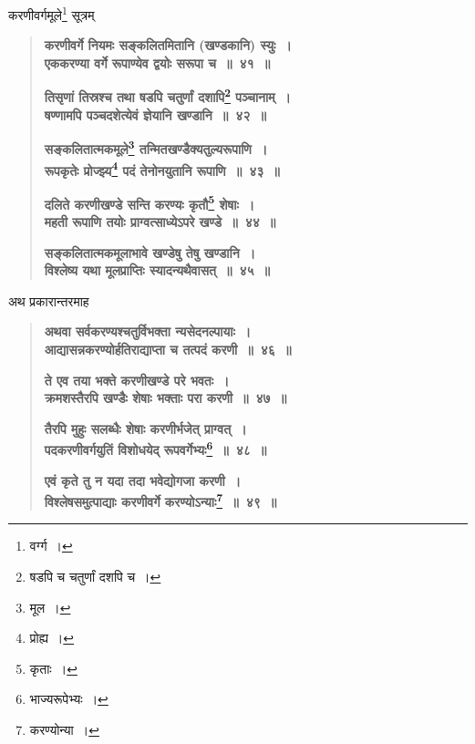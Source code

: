 \documentclass[11pt, openany]{book}
\begin{document}
\newpage

करणीवर्गमूले\renewcommand{\thefootnote}{१}\footnote{वर्ग्ग~।} सूत्रम् \textendash 

\begin{quote}
\textbf{{\color{purple}करणीवर्गे नियमः सङ्कलितमितानि (खण्डकानि) स्युः~। \\
एककरण्या वर्गे रूपाण्येव द्वयोः सरूपा च~॥~४१~॥}}
\vspace{1mm}

\textbf{{\color{purple}तिसृणां तिस्रश्च तथा षडपि चतुर्णां दशापि\renewcommand{\thefootnote}{२}\footnote{षडपि च चतुर्णां दशपि च~।} पञ्चानाम्~। \\
षण्णामपि पञ्चदशेत्येवं ज्ञेयानि खण्डानि~॥~४२~॥}}
\vspace{1mm}

\textbf{{\color{purple}सङ्कलितात्मकमूले\renewcommand{\thefootnote}{३}\footnote{मूल~।} तन्मितखण्डैक्यतुल्यरूपाणि~।\\
रूपकृतेः प्रोज्झ्य\renewcommand{\thefootnote}{४}\footnote{प्रोह्य~।} पदं तेनोनयुतानि रूपाणि~॥~४३~॥}}
\vspace{1mm}

\textbf{{\color{purple}दलिते करणीखण्डे सन्ति करण्यः कृतौ\renewcommand{\thefootnote}{५}\footnote{कृताः~।} शेषाः~। \\
महती रूपाणि तयोः प्राग्वत्साध्येऽपरे खण्डे~॥~४४~॥}}
\vspace{1mm}

\textbf{{\color{purple}सङ्कलितात्मकमूलाभावे खण्डेषु तेषु खण्डानि~। \\
विश्लेष्य यथा मूलप्राप्तिः स्यादन्यथैवासत्~॥~४५~॥}}
\end{quote}

अथ प्रकारान्तरमाह \textendash 

\begin{quote}
\textbf{{\color{purple}अथवा सर्वकरण्यश्चतुर्विभक्ता न्यसेदनल्पायाः~।\\
आद्यासन्नकरण्योर्हतिराद्याप्ता च तत्पदं करणी~॥~४६~॥}}
\vspace{1mm}

\textbf{{\color{purple}ते एव तया भक्ते करणीखण्डे परे भवतः~। \\
क्रमशस्तैरपि खण्डैः शेषाः भक्ताः परा करणी~॥~४७~॥}}
\vspace{1mm}

\textbf{{\color{purple}तैरपि मुहुः सलब्धैः शेषाः करणीर्भजेत् प्राग्वत्~। \\
पदकरणीवर्गयुतिं विशोधयेद् रूपवर्गेभ्यः\renewcommand{\thefootnote}{६}\footnote{भाज्यरूपेभ्यः~।}~॥~४८~॥}}
\vspace{1mm}

\textbf{{\color{purple}एवं कृते तु न यदा तदा भवेद्योगजा करणी~। \\
विश्लेषसमुत्पाद्याः करणीवर्गे करण्योऽन्याः\renewcommand{\thefootnote}{७}\footnote{करण्योन्या~।}~॥~४९~॥}}
\end{quote}
\end{document}
